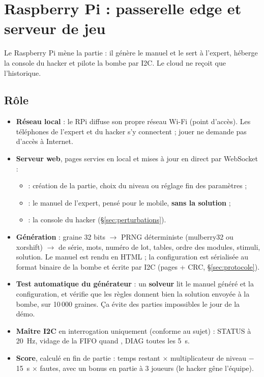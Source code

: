 \documentclass[11pt,a4paper]{article}
\newcommand{\code}[1]{\texttt{\detokenize{#1}}}
\begin{document}
\section{Raspberry Pi : passerelle edge et serveur de jeu}
\label{sec:passerelle}

Le Raspberry Pi mène la partie : il génère le manuel et le sert à l'expert, héberge la console du hacker et pilote la bombe par I2C. Le cloud ne reçoit que l'historique.

\subsection{Rôle}

\begin{itemize}
  \item \textbf{Réseau local} : le RPi diffuse son propre réseau Wi-Fi (point d'accès). Les téléphones de l'expert et du hacker s'y connectent ; jouer ne demande pas d'accès à Internet.
  \item \textbf{Serveur web}, pages servies en local et mises à jour en direct par WebSocket :
  \begin{itemize}
    \item \code{/} : création de la partie, choix du niveau ou réglage fin des paramètres ;
    \item \code{/manuel} : le manuel de l'expert, pensé pour le mobile, \textbf{sans la solution} ;
    \item \code{/hacker} : la console du hacker (\S\ref{sec:perturbations}).
  \end{itemize}
  \item \textbf{Génération} : graine 32 bits $\to$ PRNG déterministe (mulberry32 ou xorshift) $\to$ \no{} de série, mots, numéro de lot, tables, ordre des modules, stimuli, solution. Le manuel est rendu en HTML ; la configuration est sérialisée au format binaire de la bombe et écrite par I2C (pages + CRC, \S\ref{sec:protocole}).
  \item \textbf{Test automatique du générateur} : un \textbf{solveur} lit le manuel généré et la configuration, et vérifie que les règles donnent bien la solution envoyée à la bombe, sur 10\,000 graines. Ça évite des parties impossibles le jour de la démo.
  \item \textbf{Maître I2C} en interrogation uniquement (conforme au sujet) : STATUS à 20~Hz, vidage de la FIFO quand \code{EVT_COUNT > 0}, DIAG toutes les 5~s.
  \item \textbf{Score}, calculé en fin de partie : temps restant × multiplicateur de niveau $-$ 15~s × fautes, avec un bonus en partie à 3 joueurs (le hacker gêne l'équipe).

\end{itemize}
\end{document}
